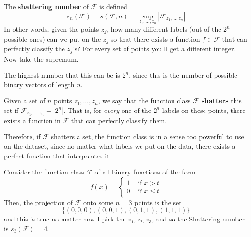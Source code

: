   \begin{definition}
    The \textbf{shattering number} of $\mathcal{F}$ is defined 
    \begin{equation}
      s_n (\mathcal{F}) = s(\mathcal{F}, n) = \sup_{z_1, \ldots, z_n} |\mathcal{F}_{z_1, \ldots, z_n}|
    \end{equation}
    In other words, given the points $z_j$, how many different labels (out of the $2^n$ possible ones) can we put on the $z_j$ so that there exists a function $f \in \mathcal{F}$ that can perfectly classify the $z_j$'s? For every set of points you'll get a different integer. Now take the supremum. 
  \end{definition}

  The highest number that this can be is $2^n$, since this is the number of possible binary vectors of length $n$. 

  \begin{definition}
    Given a set of $n$ points $z_1, \ldots, z_n$, we say that the function class $\mathcal{F}$ \textbf{shatters} this set if $\mathcal{F}_{z_1, \ldots, z_n} = |2^n|$. That is, for \textit{every} one of the $2^n$ labels on these points, there exists a function in $\mathcal{F}$ that can perfectly classify them. 
  \end{definition}

  Therefore, if $\mathcal{F}$ shatters a set, the function class is in a sense too powerful to use on the dataset, since no matter what labels we put on the data, there exists a perfect function that interpolates it. 

  \begin{example}
    Consider the function class $\mathcal{F}$ of all binary functions of the form 
    \begin{equation}
      f(x) = \begin{cases} 1 & \text{ if } x > t \\
        0 & \text{ if } x \leq t \end{cases} 
    \end{equation}
    Then, the projection of $\mathcal{F}$ onto some $n = 3$ points is the set 
    \begin{equation}
      \{ (0, 0, 0), (0, 0, 1), (0, 1, 1), (1, 1, 1) \}
    \end{equation}
    and this is true no matter how I pick the $z_1, z_2, z_3$, and so the Shattering number is $s_3 (\mathcal{F}) = 4$. 
  \end{example}

